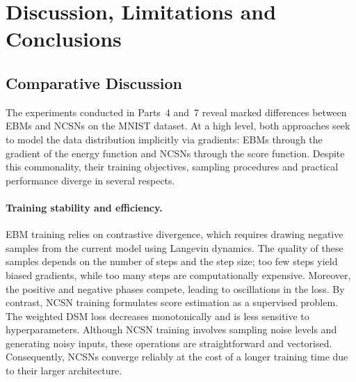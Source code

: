 

\section{Discussion, Limitations and Conclusions}

\subsection{Comparative Discussion}

The experiments conducted in Parts~4 and~7 reveal marked differences
between EBMs and NCSNs on the MNIST dataset.  At a high level, both
approaches seek to model the data distribution implicitly via gradients:
EBMs through the gradient of the energy function and NCSNs through the
score function.  Despite this commonality, their training objectives,
sampling procedures and practical performance diverge in several respects.

\paragraph{Training stability and efficiency.}
EBM training relies on contrastive divergence, which requires drawing
negative samples from the current model using Langevin dynamics.  The
quality of these samples depends on the number of steps and the step
size; too few steps yield biased gradients, while too many steps are
computationally expensive.  Moreover, the positive and negative phases
compete, leading to oscillations in the loss.  By contrast, NCSN
training formulates score estimation as a supervised problem.  The
weighted DSM loss decreases monotonically and is less sensitive to
hyperparameters.  Although NCSN training involves sampling noise levels
and generating noisy inputs, these operations are straightforward and
vectorised.  Consequently, NCSNs converge reliably at the cost of a
longer training time due to their larger architecture.

